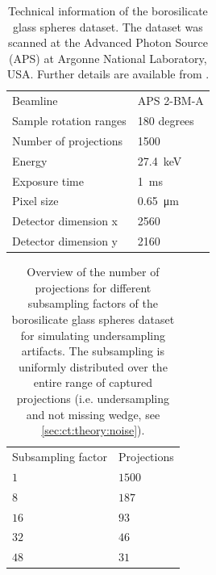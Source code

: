 \begin{table}[htbp]
    \centering
    \caption[Technical information of the borosilicate glass spheres dataset]{Technical information of the borosilicate glass spheres dataset. The dataset was scanned at the Advanced Photon Source (APS) at Argonne National Laboratory, USA. Further details are available from \cite{datasetglassspheres}. }
    \label{tab:tomo00058}
    \begin{tabular}{ll}
    \hline
    Beamline & APS 2-BM-A\\
    Sample rotation ranges & 180 degrees \\
    Number of projections & 1500 \\
    Energy & \SI{27.4}{\kilo \electronvolt}\\
    Exposure time & \SI{1}{\milli \second}\\
    Pixel size & \SI{0.65}{\micro \meter} \\
    Detector dimension x & 2560 \\
    Detector dimension y & 2160 \\
    \hline
    \end{tabular}
\end{table}

\begin{table}[htbp]
    \centering
    \caption[Projection subsampling overview for reconstructions of the borosilicate glass spheres dataset.]{Overview of the number of projections for different subsampling factors of the borosilicate glass spheres dataset for simulating undersampling artifacts. The subsampling is uniformly distributed over the entire range of captured projections (i.e. undersampling and not missing wedge, see \cref{sec:ct:theory:noise}). }
    \label{tab:projectionsubsampling}
    \begin{tabular}{ll}
    \hline
    Subsampling factor & Projections \\
    \hhline{==}
    $1$ & $1500$ \\
    $8$ & $187$ \\
    $16$ & $93$ \\
    $32$ & $46$ \\
    $48$ & $31$ \\
    \hline
    \end{tabular}
\end{table}

